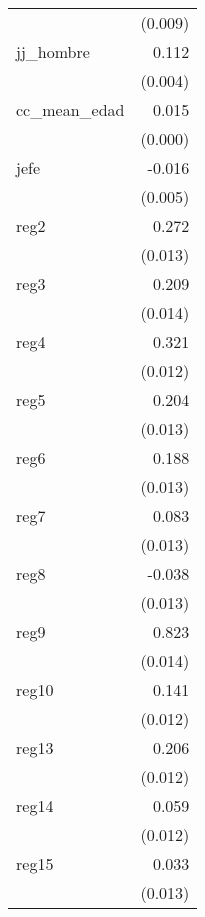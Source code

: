 {\begin{longtable}{l*{1}{D{.}{.}{-1}}}
            &     (0.009)         \\
\addlinespace
jj\_hombre   &       0.112\sym{***}\\
            &     (0.004)         \\
\addlinespace
cc\_mean\_edad&       0.015\sym{***}\\
            &     (0.000)         \\
\addlinespace
jefe        &      -0.016\sym{**} \\
            &     (0.005)         \\
\addlinespace
reg2        &       0.272\sym{***}\\
            &     (0.013)         \\
\addlinespace
reg3        &       0.209\sym{***}\\
            &     (0.014)         \\
\addlinespace
reg4        &       0.321\sym{***}\\
            &     (0.012)         \\
\addlinespace
reg5        &       0.204\sym{***}\\
            &     (0.013)         \\
\addlinespace
reg6        &       0.188\sym{***}\\
            &     (0.013)         \\
\addlinespace
reg7        &       0.083\sym{***}\\
            &     (0.013)         \\
\addlinespace
reg8        &      -0.038\sym{**} \\
            &     (0.013)         \\
\addlinespace
reg9        &       0.823\sym{***}\\
            &     (0.014)         \\
\addlinespace
reg10       &       0.141\sym{***}\\
            &     (0.012)         \\
\addlinespace
reg13       &       0.206\sym{***}\\
            &     (0.012)         \\
\addlinespace
reg14       &       0.059\sym{***}\\
            &     (0.012)         \\
\addlinespace
reg15       &       0.033\sym{**} \\
            &     (0.013)         \\

\end{longtable}}
